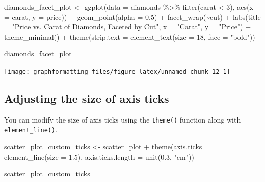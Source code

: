 \documentclass[
]{book}
\newenvironment{Shaded}{\begin{snugshade}}{\end{snugshade}}
\newcommand{\AttributeTok}[1]{\textcolor[rgb]{0.77,0.63,0.00}{#1}}
\newcommand{\DecValTok}[1]{\textcolor[rgb]{0.00,0.00,0.81}{#1}}
\newcommand{\FloatTok}[1]{\textcolor[rgb]{0.00,0.00,0.81}{#1}}
\newcommand{\FunctionTok}[1]{\textcolor[rgb]{0.00,0.00,0.00}{#1}}
\newcommand{\NormalTok}[1]{#1}
\newcommand{\OtherTok}[1]{\textcolor[rgb]{0.56,0.35,0.01}{#1}}
\newcommand{\SpecialCharTok}[1]{\textcolor[rgb]{0.00,0.00,0.00}{#1}}
\newcommand{\StringTok}[1]{\textcolor[rgb]{0.31,0.60,0.02}{#1}}
\begin{document}
\begin{Shaded}
\begin{Highlighting}[]
\NormalTok{diamonds\_facet\_plot }\OtherTok{\textless{}{-}} \FunctionTok{ggplot}\NormalTok{(}\AttributeTok{data =}\NormalTok{ diamonds }\SpecialCharTok{\%\textgreater{}\%} \FunctionTok{filter}\NormalTok{(carat }\SpecialCharTok{\textless{}} \DecValTok{3}\NormalTok{), }\FunctionTok{aes}\NormalTok{(}\AttributeTok{x =}\NormalTok{ carat, }\AttributeTok{y =}\NormalTok{ price)) }\SpecialCharTok{+}
\FunctionTok{geom\_point}\NormalTok{(}\AttributeTok{alpha =} \FloatTok{0.5}\NormalTok{) }\SpecialCharTok{+}
\FunctionTok{facet\_wrap}\NormalTok{(}\SpecialCharTok{\textasciitilde{}}\NormalTok{cut) }\SpecialCharTok{+}
\FunctionTok{labs}\NormalTok{(}\AttributeTok{title =} \StringTok{"Price vs. Carat of Diamonds, Faceted by Cut"}\NormalTok{,}
\AttributeTok{x =} \StringTok{"Carat"}\NormalTok{,}
\AttributeTok{y =} \StringTok{"Price"}\NormalTok{) }\SpecialCharTok{+}
\FunctionTok{theme\_minimal}\NormalTok{() }\SpecialCharTok{+}
\FunctionTok{theme}\NormalTok{(}\AttributeTok{strip.text =} \FunctionTok{element\_text}\NormalTok{(}\AttributeTok{size =} \DecValTok{18}\NormalTok{, }\AttributeTok{face =} \StringTok{"bold"}\NormalTok{))}

\NormalTok{diamonds\_facet\_plot}
\end{Highlighting}
\end{Shaded}

\texttt{[image: graphformatting\_files/figure-latex/unnamed-chunk-12-1]}

\hypertarget{adjusting-the-size-of-axis-ticks}{%
\subsection{Adjusting the size of axis ticks}\label{adjusting-the-size-of-axis-ticks}}

You can modify the size of axis ticks using the \texttt{theme()} function along with \texttt{element\_line()}.

\begin{Shaded}
\begin{Highlighting}[]
\NormalTok{scatter\_plot\_custom\_ticks }\OtherTok{\textless{}{-}}\NormalTok{ scatter\_plot }\SpecialCharTok{+}
  \FunctionTok{theme}\NormalTok{(}\AttributeTok{axis.ticks =} \FunctionTok{element\_line}\NormalTok{(}\AttributeTok{size =} \FloatTok{1.5}\NormalTok{),}
        \AttributeTok{axis.ticks.length =} \FunctionTok{unit}\NormalTok{(}\FloatTok{0.3}\NormalTok{, }\StringTok{"cm"}\NormalTok{))}

\NormalTok{scatter\_plot\_custom\_ticks}
\end{Highlighting}
\end{Shaded}
\end{document}
